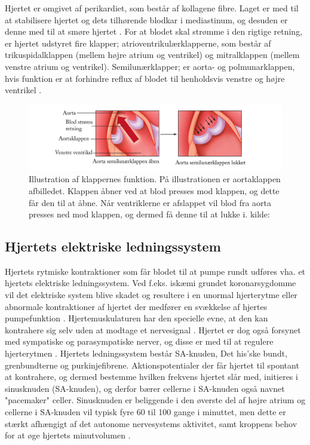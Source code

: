 Hjertet er omgivet af perikardiet, som består af kollagene fibre. Laget er med til at stabilisere hjertet og dets tilhørende blodkar i mediastinum, og desuden er denne med til at smøre hjertet . For at blodet skal strømme i den rigtige retning, er hjertet udstyret fire klapper; atrioventrikulærklapperne, som består af trikuspidalklappen (mellem højre atrium og  ventrikel) og mitralklappen (mellem venstre atrium og ventrikel). Semilunærklapper; er aorta- og polmunarklappen, hvis funktion er at forhindre reflux af blodet til henholdsvis venstre og højre ventrikel \cite{gronanatomi}.  

\begin{figure}[H]
\includegraphics[scale=0.7]{figures/cusp}
\caption{ Illustration af klappernes funktion. På illustrationen er aortaklappen afbilledet. Klappen åbner ved at blod presses mod klappen, og dette får den til at åbne. Når ventriklerne er afslappet vil blod fra aorta presses ned mod klappen, og dermed få denne til at lukke i. kilde: \cite{cindy}}
\end{figure}

\subsection{Hjertets elektriske ledningssystem}
Hjertets rytmiske kontraktioner som får blodet til at pumpe rundt udføres vha. et hjertets elektriske ledningssystem. Ved f.eks. iskæmi grundet koronarsygdomme vil det elektriske system blive skadet og resultere i en unormal hjerterytme eller abnormale kontraktioner af hjertet der medfører en svækkelse af hjertes pumpefunktion \cite{guyton}. Hjertemuskulaturen har den specielle evne, at den kan kontrahere sig selv uden at modtage et nervesignal \cite{gronanatomi}. Hjertet er dog også forsynet med sympatiske og parasympatiske nerver, og disse er med til at regulere hjerterytmen \cite{cindy}. 
Hjertets ledningssystem består SA-knuden, Det his'ske bundt, grenbundterne og purkinjefibrene.
Aktionspotentialer der får hjertet til spontant at kontrahere, og dermed bestemme hvilken frekvens hjertet slår med, initieres i sinusknuden (SA-knuden), og derfor bærer cellerne i SA-knuden også navnet "pacemaker" celler.
Sinusknuden er beliggende i den øverste del af højre atrium og cellerne i SA-knuden vil typisk fyre 60 til 100 gange i minuttet, men dette er stærkt afhængigt af det autonome nervesystems aktivitet, samt kroppens behov for at øge hjertets
minutvolumen \cite{ekgbook}.

